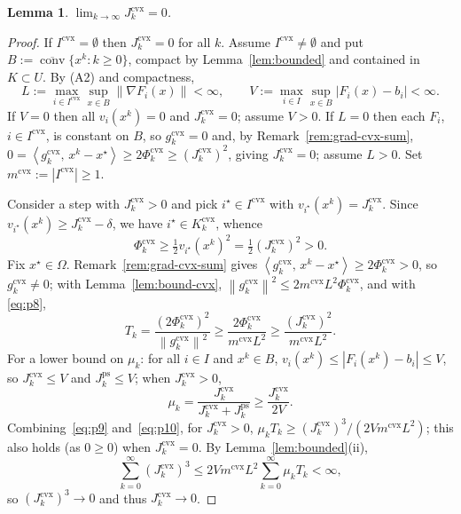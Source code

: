 \documentclass[]{interact}
\theoremstyle{plain}
\newtheorem{lemma}[theorem]{Lemma}
\theoremstyle{definition}
\theoremstyle{remark}
\newcommand{\norm}[1]{\left\lVert #1 \right\rVert}
\newcommand{\abs}[1]{\left\lvert #1 \right\rvert}
\newcommand{\inner}[2]{\left\langle #1,\, #2 \right\rangle}
\DeclareMathOperator{\conv}{conv}
\newcommand{\cvx}{\mathrm{cvx}}
\newcommand{\ps}{\mathrm{ps}}
\begin{document}
\begin{lemma}\label{lem:jcvx0}
$\displaystyle\lim_{k\to\infty}J^{\cvx}_k=0$.
\end{lemma}
\begin{proof}
If $I^{\cvx}=\emptyset$ then $J^{\cvx}_k=0$ for all $k$. Assume $I^{\cvx}\ne\emptyset$ and
put $B:=\overline{\conv}\{x^k:k\ge0\}$, compact by Lemma~\ref{lem:bounded} and contained
in $K\subset U$. By (A2) and
compactness,
\[
L:=\max_{i\in I^{\cvx}}\sup_{x\in B}\norm{\nabla F_i(x)}<\infty,\qquad
V:=\max_{i\in I}\sup_{x\in B}\abs{F_i(x)-b_i}<\infty.
\]
If $V=0$ then all $v_i(x^k)=0$ and
$J^{\cvx}_k=0$; assume $V>0$. If $L=0$ then each $F_i$, $i\in I^{\cvx}$, is constant on
$B$, so $g^{\cvx}_k=0$ and, by Remark~\ref{rem:grad-cvx-sum},
$0=\inner{g^{\cvx}_k}{x^k-x^\star}\ge 2\Phi^{\cvx}_k\ge(J^{\cvx}_k)^2$, giving
$J^{\cvx}_k=0$; assume $L>0$. Set $m^{\cvx}:=\abs{I^{\cvx}}\ge1$.

Consider a step with $J^{\cvx}_k>0$ and pick $i^\star\in I^{\cvx}$ with
$v_{i^\star}(x^k)=J^{\cvx}_k$. Since $v_{i^\star}(x^k)\ge J^{\cvx}_k-\delta$, we have
$i^\star\in K^{\cvx}_k$, whence
\begin{equation}\label{eq:p8}
\Phi^{\cvx}_k\ge\tfrac12 v_{i^\star}(x^k)^2=\tfrac12(J^{\cvx}_k)^2>0 .
\end{equation}
Fix $x^\star\in\Omega$. Remark~\ref{rem:grad-cvx-sum} gives
$\inner{g^{\cvx}_k}{x^k-x^\star}\ge2\Phi^{\cvx}_k>0$, so $g^{\cvx}_k\ne0$; with
Lemma~\ref{lem:bound-cvx}, $\norm{g^{\cvx}_k}^2\le2m^{\cvx}L^2\Phi^{\cvx}_k$, and with
\eqref{eq:p8},
\begin{equation}\label{eq:p9}
T_k=\frac{(2\Phi^{\cvx}_k)^2}{\norm{g^{\cvx}_k}^2}\ge\frac{2\Phi^{\cvx}_k}{m^{\cvx}L^2}\ge\frac{(J^{\cvx}_k)^2}{m^{\cvx}L^2}.
\end{equation}
For a lower bound on $\mu_k$: for all $i\in I$ and $x^k\in B$,
$v_i(x^k)\le\abs{F_i(x^k)-b_i}\le V$, so $J^{\cvx}_k\le V$ and $J^{\ps}_k\le V$; when
$J^{\cvx}_k>0$,
\begin{equation}\label{eq:p10}
\mu_k=\frac{J^{\cvx}_k}{J^{\cvx}_k+J^{\ps}_k}\ge\frac{J^{\cvx}_k}{2V}.
\end{equation}
Combining~\eqref{eq:p9} and~\eqref{eq:p10}, for $J^{\cvx}_k>0$,
$\mu_k T_k\ge(J^{\cvx}_k)^3/(2Vm^{\cvx}L^2)$; this also holds (as $0\ge0$) when
$J^{\cvx}_k=0$. By Lemma~\ref{lem:bounded}(ii),
\begin{equation}\label{eq:p12}
\sum_{k=0}^\infty(J^{\cvx}_k)^3\le 2Vm^{\cvx}L^2\sum_{k=0}^\infty\mu_k T_k<\infty,
\end{equation}
so $(J^{\cvx}_k)^3\to0$ and thus $J^{\cvx}_k\to0$.
\end{proof}
\end{document}
